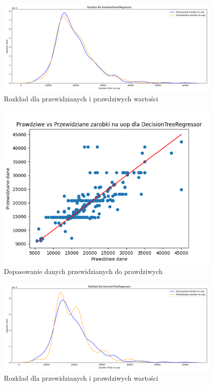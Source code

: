 \documentclass[a4paper]{article}
\begin{document}
\begin{figure}[H]
    \centering
    \includegraphics[width=\textwidth]{../analysis/plots/wyniki/0.8&0.2/uop/RandomForestRegressor/salary_dist.png}
    \caption{Rozkład dla przewidzianych i prawdziwych wartości}
\end{figure}

\begin{figure}[H]
    \centering
    \includegraphics[width=\textwidth]{../analysis/plots/wyniki/0.8&0.2/uop/DecisionTreeRegressor/scatter.png}
    \caption{Dopasowanie danych przewidzianych do prawdziwych}
\end{figure}

\begin{figure}[H]
    \centering
    \includegraphics[width=\textwidth]{../analysis/plots/wyniki/0.8&0.2/uop/DecisionTreeRegressor/salary_dist.png}
    \caption{Rozkład dla przewidzianych i prawdziwych wartości}
\end{figure}
\end{document}

